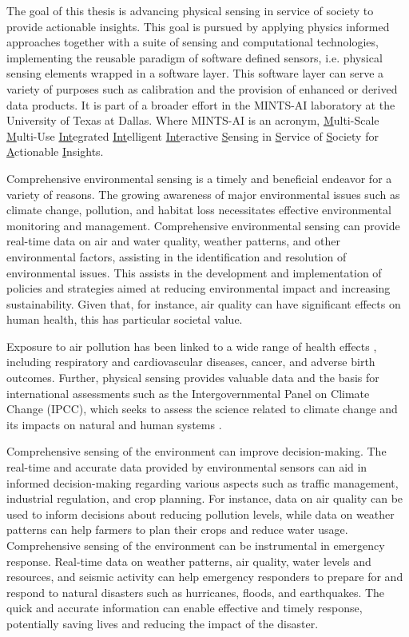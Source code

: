 The goal of this thesis is advancing physical sensing in service of society to provide actionable insights. This goal is pursued by applying physics informed approaches together with a suite of sensing and computational technologies, implementing the reusable paradigm of software defined sensors, i.e. physical sensing elements wrapped in a software layer. This software layer can serve a variety of purposes such as calibration and the provision of enhanced or derived data products. It is part of a broader effort in the MINTS-AI laboratory at the University of Texas at Dallas. Where MINTS-AI is an acronym, \underline{M}ulti-Scale \underline{M}ulti-Use \underline{Int}egrated \underline{Int}elligent \underline{Int}eractive \underline{S}ensing in \underline{S}ervice of \underline{S}ociety for \underline{A}ctionable \underline{I}nsights.

Comprehensive environmental sensing is a timely and beneficial endeavor for a variety of reasons. The growing awareness of major environmental issues such as climate change, pollution, and habitat loss necessitates effective environmental monitoring and management. Comprehensive environmental sensing can provide real-time data on air and water quality, weather patterns, and other environmental factors, assisting in the identification and resolution of environmental issues. This assists in the development and implementation of policies and strategies aimed at reducing environmental impact and increasing sustainability. Given that, for instance, air quality can have significant effects on human health, this has particular societal value. 

Exposure to air pollution has been linked to a wide range of health effects \citep{Brook2008, Kelly2011, Xu2017}, including respiratory and cardiovascular diseases, cancer, and adverse birth outcomes. Further, physical sensing provides valuable data and the basis for international assessments such as the Intergovernmental Panel on Climate Change (IPCC), which seeks to assess the science related to climate change and its impacts on natural and human systems \citep{IPCC1990, IPCC1995, IPCC2001, IPCC2007a, IPCC2007b, IPCC2007c, IPCC2013a, IPCC2013b, IPCC2014, IPCC2018, Friedlingstein2020, Huang2017}. 

Comprehensive sensing of the environment can improve decision-making. The real-time and accurate data provided by environmental sensors can aid in informed decision-making regarding various aspects such as traffic management, industrial regulation, and crop planning. For instance, data on air quality can be used to inform decisions about reducing pollution levels, while data on weather patterns can help farmers to plan their crops and reduce water usage. Comprehensive sensing of the environment can be instrumental in emergency response. Real-time data on weather patterns, air quality, water levels and resources, and seismic activity can help emergency responders to prepare for and respond to natural disasters such as hurricanes, floods, and earthquakes. The quick and accurate information can enable effective and timely response, potentially saving lives and reducing the impact of the disaster. 

